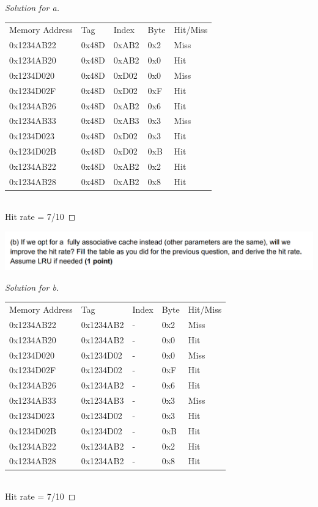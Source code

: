\documentclass[12pt]{article}
\begin{document}
\begin{proof}[Solution for a]
	\ \\
	\begin{tabular}{lllll}
		Memory Address & Tag   & Index & Byte  & Hit/Miss \\
		0x1234AB22 & 0x48D & 0xAB2 & 0x2   & Miss \\
		0x1234AB20 & 0x48D & 0xAB2 & 0x0   & Hit \\
		0x1234D020 & 0x48D & 0xD02 & 0x0   & Miss \\
		0x1234D02F & 0x48D & 0xD02 & 0xF   & Hit \\
		0x1234AB26 & 0x48D & 0xAB2 & 0x6   & Hit \\
		0x1234AB33 & 0x48D & 0xAB3 & 0x3   & Miss \\
		0x1234D023 & 0x48D & 0xD02 & 0x3   & Hit \\
		0x1234D02B & 0x48D & 0xD02 & 0xB   & Hit \\
		0x1234AB22 & 0x48D & 0xAB2 & 0x2   & Hit \\
		0x1234AB28 & 0x48D & 0xAB2 & 0x8   & Hit \\
	\end{tabular}\\
Hit rate = 7/10
\end{proof}
\includegraphics[scale=0.37]{q2_q2.png}\\
\begin{proof}[Solution for b]
	\ \\
	 \begin{tabular}{lllll}
		Memory Address & Tag   & Index & Byte  & Hit/Miss \\
		0x1234AB22 & 0x1234AB2 & -     & 0x2   & Miss \\
		0x1234AB20 & 0x1234AB2 & -     & 0x0   & Hit \\
		0x1234D020 & 0x1234D02 & -     & 0x0   & Miss \\
		0x1234D02F & 0x1234D02 & -     & 0xF   & Hit \\
		0x1234AB26 & 0x1234AB2 & -     & 0x6   & Hit \\
		0x1234AB33 & 0x1234AB3 & -     & 0x3   & Miss \\
		0x1234D023 & 0x1234D02 & -     & 0x3   & Hit \\
		0x1234D02B & 0x1234D02 & -     & 0xB   & Hit \\
		0x1234AB22 & 0x1234AB2 & -     & 0x2   & Hit \\
		0x1234AB28 & 0x1234AB2 & -     & 0x8   & Hit \\
	\end{tabular}\\
	Hit rate = 7/10
\end{proof}
\end{document}
